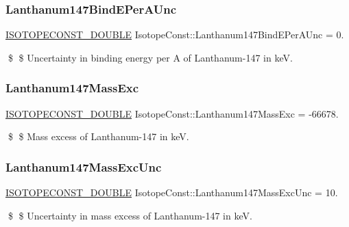\subsubsection{\texorpdfstring{Lanthanum147\+Bind\+E\+Per\+A\+Unc}{Lanthanum147BindEPerAUnc}}
{\footnotesize\ttfamily \mbox{\hyperlink{group___isotope_const-_macros_ga8f45a7272ce02c0b4c65c44636ed719a}{I\+S\+O\+T\+O\+P\+E\+C\+O\+N\+S\+T\+\_\+\+D\+O\+U\+B\+LE}} Isotope\+Const\+::\+Lanthanum147\+Bind\+E\+Per\+A\+Unc = 0.}

\$ \$ Uncertainty in binding energy per A of Lanthanum-\/147 in keV. \mbox{\label{group___isotope_const-_lanthanum-_la147_ga1eb93d77bbe220658d24499d8f97434f}} 
\subsubsection{\texorpdfstring{Lanthanum147\+Mass\+Exc}{Lanthanum147MassExc}}
{\footnotesize\ttfamily \mbox{\hyperlink{group___isotope_const-_macros_ga8f45a7272ce02c0b4c65c44636ed719a}{I\+S\+O\+T\+O\+P\+E\+C\+O\+N\+S\+T\+\_\+\+D\+O\+U\+B\+LE}} Isotope\+Const\+::\+Lanthanum147\+Mass\+Exc = -\/66678.}

\$ \$ Mass excess of Lanthanum-\/147 in keV. \mbox{\label{group___isotope_const-_lanthanum-_la147_ga43332dada9e2be0eb7565b16c06345bd}} 
\subsubsection{\texorpdfstring{Lanthanum147\+Mass\+Exc\+Unc}{Lanthanum147MassExcUnc}}
{\footnotesize\ttfamily \mbox{\hyperlink{group___isotope_const-_macros_ga8f45a7272ce02c0b4c65c44636ed719a}{I\+S\+O\+T\+O\+P\+E\+C\+O\+N\+S\+T\+\_\+\+D\+O\+U\+B\+LE}} Isotope\+Const\+::\+Lanthanum147\+Mass\+Exc\+Unc = 10.}

\$ \$ Uncertainty in mass excess of Lanthanum-\/147 in keV. \mbox{\label{group___isotope_const-_lanthanum-_la147_ga3e08963755495490b76fe31dc42465f2}} 
